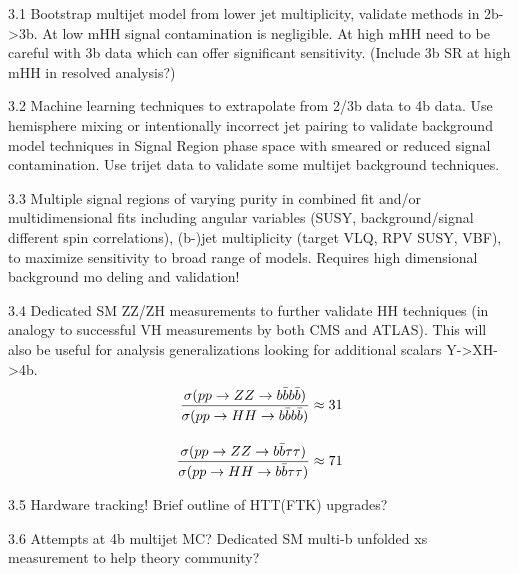 3.1 Bootstrap multijet model from lower jet multiplicity, validate methods in 2b->3b. At low mHH signal contamination is negligible. At high mHH need to be careful with 3b data which can offer significant sensitivity. (Include 3b SR at high mHH in resolved analysis?)

3.2 Machine learning techniques to extrapolate from 2/3b data to 4b data. Use hemisphere mixing or intentionally incorrect jet pairing to validate background model techniques in Signal Region phase space with smeared or reduced signal contamination. Use trijet data to validate some multijet background techniques. 

3.3 Multiple signal regions of varying purity in combined fit and/or multidimensional fits including angular variables (SUSY, background/signal different spin correlations), (b-)jet multiplicity (target VLQ, RPV SUSY, VBF), to maximize sensitivity to broad range of models. Requires high dimensional background mo
deling and validation! 

3.4 Dedicated SM ZZ/ZH measurements to further validate HH techniques (in analogy to successful VH measurements by both CMS and ATLAS). This will also be useful for analysis generalizations looking for additional scalars Y->XH->4b. 
\begin{equation*}
  \begin{split}
    \frac{\sigma(pp\rightarrow ZZ\rightarrow b\bar{b}b\bar{b})  }{\sigma(pp\rightarrow HH\rightarrow b\bar{b}b\bar{b})  } &\approx 31 \\[10pt]
    \frac{\sigma(pp\rightarrow ZZ\rightarrow b\bar{b}\tau\tau)}{\sigma(pp\rightarrow HH\rightarrow b\bar{b}\tau\tau)} &\approx 71
  \end{split}
\end{equation*}

3.5 Hardware tracking! Brief outline of HTT(FTK) upgrades? 

3.6 Attempts at 4b multijet MC? Dedicated SM multi-b unfolded xs measurement to help theory community?
        


